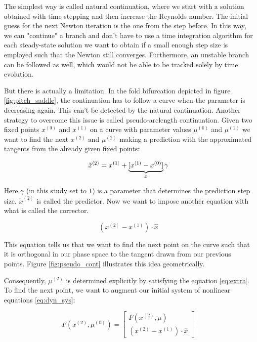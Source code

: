 The simplest way is called natural continuation, where we start with a solution
obtained with time stepping and then increase the Reynolds number. The initial
guess for the next Newton iteration is the one from the step before. In this
way, we can "continue" a branch and don't have to use a time integration
algorithm for each steady-state solution we want to obtain if a small enough
step size is employed such that the Newton still converges. Furthermore, an
unstable branch can be followed as well, which would not be able to be tracked
solely by time evolution.

But there is actually a limitation. In the fold bifurcation depicted in figure
\ref{fig:pitch_saddle}, the continuation has to follow a curve when the parameter
is decreasing again. This can't be detected by the natural continuation.
Another strategy to overcome this issue is called pseudo-arclength
continuation. Given two fixed points $x^{(0)}$ and $x^{(1)}$ on a curve with
parameter values $\mu^{(0)}$ and $\mu^{(1)}$ we want to find the next $x^{(2)}$
and $\mu^{(2)}$ making a prediction with the approximated tangents from the
already given fixed points:

\begin{equation}
  \tilde{x}^{(2)} = x^{(1)}  + \underbrace{[x^{(1)} - x^{(0)}]}_{\text{\normalfont $\hat{x}$}} \gamma
\end{equation}

Here $\gamma$ (in this study set to $1$) is a parameter that determines the
prediction step size. $\tilde{x}^{(2)}$ is called the predictor. Now we want to
impose another equation with what is called the corrector.

\begin{equation}
  (x^{(2)} - x^{(1)})  \cdot \hat{x} \label{eq:extra}
\end{equation}

This equation tells us that we want to find the next point on the curve such
that it is orthogonal in our phase space to the tangent drawn from our previous
points. Figure \ref{fig:pseudo_cont} illustrates this idea geometrically.

Consequently, $\mu^{(2)}$ is determined explicitly by satisfying the equation
\eqref{eq:extra}. To find the next point, we want to augment our initial system
of nonlinear equations \eqref{eq:dyn_sys}:

\begin{equation}
  F(x^{(2)}, \mu^{(0)}) = 
\begin{bmatrix} F(x^{(2)}, \mu) \\ (x^{(2)} - x^{(1)})  \cdot \hat{x}
\end{bmatrix} \label{eq:dyn_sys_cont}
\end{equation}

